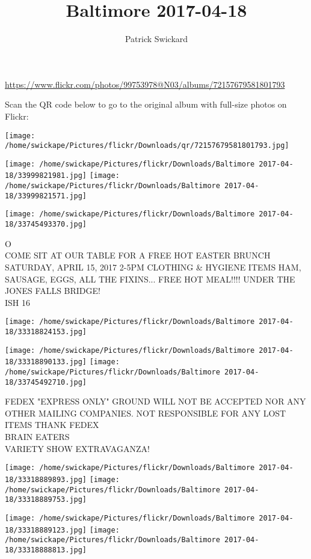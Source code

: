 \documentclass[10pt,letterpaper]{article}
\title{Baltimore 2017-04-18}
\author{Patrick Swickard}
\date{}
\begin{document}
\maketitle

\url{https://www.flickr.com/photos/99753978@N03/albums/72157679581801793}

Scan the QR code below to go to the original album with full-size photos on Flickr:

\texttt{[image: /home/swickape/Pictures/flickr/Downloads/qr/72157679581801793.jpg]}
\pagebreak

\texttt{[image: /home/swickape/Pictures/flickr/Downloads/Baltimore 2017-04-18/33999821981.jpg]}
\texttt{[image: /home/swickape/Pictures/flickr/Downloads/Baltimore 2017-04-18/33999821571.jpg]}

\texttt{[image: /home/swickape/Pictures/flickr/Downloads/Baltimore 2017-04-18/33745493370.jpg]}

O\\
COME SIT AT OUR TABLE FOR A FREE HOT EASTER BRUNCH SATURDAY, APRIL 15, 2017 2{-}5PM CLOTHING \& HYGIENE ITEMS HAM, SAUSAGE, EGGS, ALL THE FIXINS... FREE HOT MEAL!!!! UNDER THE JONES FALLS BRIDGE!\\
ISH 16
\pagebreak

\texttt{[image: /home/swickape/Pictures/flickr/Downloads/Baltimore 2017-04-18/33318824153.jpg]}

\vspace{0.25in}
\texttt{[image: /home/swickape/Pictures/flickr/Downloads/Baltimore 2017-04-18/33318890133.jpg]}
\texttt{[image: /home/swickape/Pictures/flickr/Downloads/Baltimore 2017-04-18/33745492710.jpg]}

FEDEX "EXPRESS ONLY" GROUND WILL NOT BE ACCEPTED NOR ANY OTHER MAILING COMPANIES.  NOT RESPONSIBLE FOR ANY LOST ITEMS THANK FEDEX\\
BRAIN EATERS\\
VARIETY SHOW EXTRAVAGANZA!
\pagebreak

\texttt{[image: /home/swickape/Pictures/flickr/Downloads/Baltimore 2017-04-18/33318889893.jpg]}
\texttt{[image: /home/swickape/Pictures/flickr/Downloads/Baltimore 2017-04-18/33318889753.jpg]}

\texttt{[image: /home/swickape/Pictures/flickr/Downloads/Baltimore 2017-04-18/33318889123.jpg]}
\texttt{[image: /home/swickape/Pictures/flickr/Downloads/Baltimore 2017-04-18/33318888813.jpg]}
\end{document}
